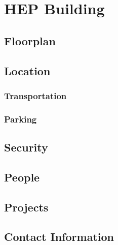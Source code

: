 
\chapter{HEP Building}
\label{chap:eq_building}


\section{Floorplan}
\label{sec:eq_building:floorplan}

\section{Location}
\label{sec:eq_building:location}

\subsection{Transportation}
\label{sec:eq_building:transportation}

\subsection{Parking}
\label{sec:eq_building:parking}

\section{Security}
\label{sec:eq_building:security}


\section{People}
\label{sec:eq_building:people}

\section{Projects}
\label{sec:eq_building:projects}


\section{Contact Information}
\label{sec:eq_building:contact}



